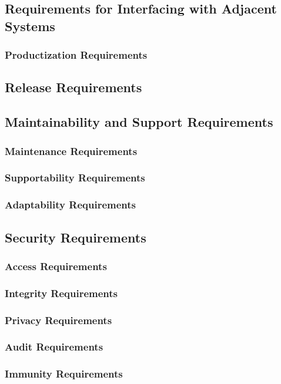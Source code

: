 \documentclass{article}
\begin{document}
    
\subsection{Requirements for Interfacing with Adjacent Systems}
    \subsubsection{Productization Requirements}
 \subsection{Release Requirements}
 \subsection{Maintainability and Support Requirements}
    \subsubsection{Maintenance Requirements}
    \subsubsection{Supportability Requirements}
    \subsubsection{Adaptability Requirements}
    
\subsection{Security Requirements}
    \subsubsection{Access Requirements}
    \subsubsection{Integrity Requirements}
    \subsubsection{Privacy Requirements}
    \subsubsection{Audit Requirements}
    \subsubsection{Immunity Requirements}
    
\end{document}
